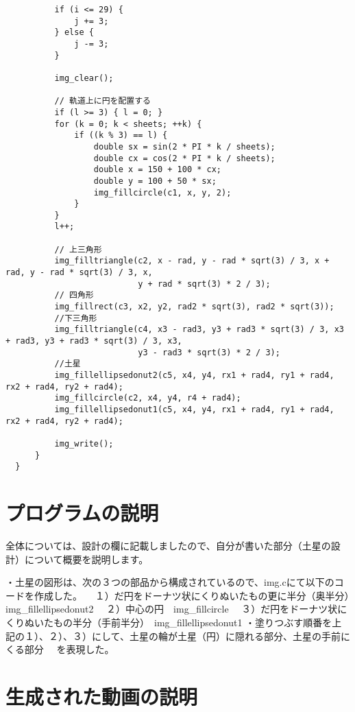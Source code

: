 \documentclass[12pt,a4j]{jarticle}
\begin{document}
\begin{verbatim}
          if (i <= 29) {
              j += 3;
          } else {
              j -= 3;
          }

          img_clear();

          // 軌道上に円を配置する
          if (l >= 3) { l = 0; }
          for (k = 0; k < sheets; ++k) {
              if ((k % 3) == l) {
                  double sx = sin(2 * PI * k / sheets);
                  double cx = cos(2 * PI * k / sheets);
                  double x = 150 + 100 * cx;
                  double y = 100 + 50 * sx;
                  img_fillcircle(c1, x, y, 2);
              }
          }
          l++;

          // 上三角形
          img_filltriangle(c2, x - rad, y - rad * sqrt(3) / 3, x + rad, y - rad * sqrt(3) / 3, x,
                           y + rad * sqrt(3) * 2 / 3);
          // 四角形
          img_fillrect(c3, x2, y2, rad2 * sqrt(3), rad2 * sqrt(3));
          //下三角形
          img_filltriangle(c4, x3 - rad3, y3 + rad3 * sqrt(3) / 3, x3 + rad3, y3 + rad3 * sqrt(3) / 3, x3,
                           y3 - rad3 * sqrt(3) * 2 / 3);
          //土星
          img_fillellipsedonut2(c5, x4, y4, rx1 + rad4, ry1 + rad4, rx2 + rad4, ry2 + rad4);
          img_fillcircle(c2, x4, y4, r4 + rad4);
          img_fillellipsedonut1(c5, x4, y4, rx1 + rad4, ry1 + rad4, rx2 + rad4, ry2 + rad4);

          img_write();
      }
  }

\end{verbatim}

\section{プログラムの説明}

全体については、設計の欄に記載しましたので、自分が書いた部分（土星の設計）について概要を説明します。

・土星の図形は、次の３つの部品から構成されているので、img.cにて以下のコードを作成した。
　１）だ円をドーナツ状にくりぬいたもの更に半分（奥半分）　img_fillellipsedonut2
　２）中心の円　img_fillcircle
　３）だ円をドーナツ状にくりぬいたもの半分（手前半分）　img_fillellipsedonut1
・塗りつぶす順番を上記の１）、２）、３）にして、土星の輪が土星（円）に隠れる部分、土星の手前にくる部分
　を表現した。

\section{生成された動画の説明}
\end{document}
